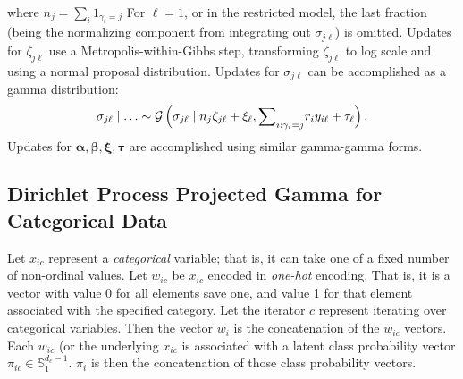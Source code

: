 \documentclass[10pt]{article}
\begin{document}
where $n_j = \sum_i 1_{\gamma_i = j}$ For $\ell = 1$, or in the restricted model, the last fraction 
    (being the normalizing component from integrating out $\sigma_{j\ell}$) is omitted.  Updates for
    $\zeta_{j\ell}$ use a Metropolis-within-Gibbs step, transforming $\zeta_{j\ell}$ to log scale and 
    using a normal proposal distribution.  Updates for $\sigma_{j\ell}$ can be accomplished as a gamma
    distribution:
\begin{equation*}
    \sigma_{j\ell}\mid \ldots \sim \mathcal{G}\left(\sigma_{j\ell}\mid n_j\zeta_{j\ell} + \xi_{\ell}, {\small\sum}_{i:\gamma_i = j}r_iy_{i\ell} + \tau_{\ell}\right).
\end{equation*}
Updates for $\bm{\alpha},\bm{\beta},\bm{\xi},\bm{\tau}$ are accomplished using similar gamma-gamma forms.

\subsection*{Dirichlet Process Projected Gamma for Categorical Data}
Let $x_{ic}$ represent a \emph{categorical} variable; that is, it can take one of a fixed number of 
    non-ordinal values.  Let $w_{ic}$ be $x_{ic}$ encoded in \emph{one-hot} encoding.  That is, it is a 
    vector with value 0 for all elements save one, and value 1 for that element associated with the 
    specified category.  Let the iterator $c$ represent iterating over categorical variables.  Then the 
    vector $w_i$ is the concatenation of the $w_{ic}$ vectors.  Each $w_{ic}$ (or the underlying $x_{ic}$ 
    is associated with a latent class probability vector $\pi_{ic} \in {\mathbb S}_1^{d_{c}-1}$.  $\pi_i$
    is then the concatenation of those class probability vectors.
    
\end{document}
